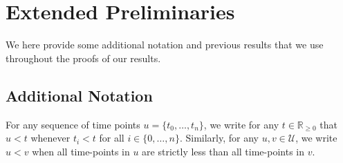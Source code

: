 \documentclass[twoside,11pt]{article}
\newcommand{\reals}{\mathbb{R}}
\newcommand{\realsnonneg}{\reals_{\geq 0}}
\newcommand{\states}{\mathcal{X}}
\newcommand{\lexp}{\underline{\mathbb{E}}_{\rateset,\mathcal{M}}}
\newcommand{\gambles}{\mathcal{L}}
\newcommand{\rateset}{\mathcal{Q}}
\begin{document}
%

\appendix
{}

%


\newpage


\section{Extended Preliminaries}

We here provide some additional notation and previous results that we use throughout the proofs of our results.

\subsection{Additional Notation}

For any sequence of time points $u=\{t_0,\ldots,t_n\}$, we write for any $t\in\realsnonneg$ that $u<t$ whenever $t_i<t$ for all $i\in\{0,\ldots,n\}$. Similarly, for any $u,v\in\mathcal{U}$, we write $u< v$ when all time-points in $u$ are strictly less than all time-points in $v$.
\end{document}
